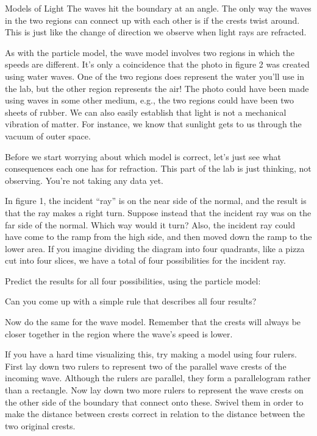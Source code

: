 \begin{lab}{Models of Light}
The waves hit the boundary at an angle. The only way the waves in the two regions can connect up with each
other is if the crests twist around. This is just like the change of direction we observe when light rays are refracted.

As with the particle model, the wave model involves two regions in which the speeds are different.
It's only a coincidence that the photo in figure 2 was created using water waves. One of the two regions does
represent the water you'll use in the lab, but the other region represents the air! The photo could have been
made using waves in some other medium, e.g., the two regions could have been two sheets of rubber. We can also
easily establish that light is not a mechanical vibration of matter. For instance, we know that sunlight gets
to us through the vacuum of outer space. 

\pagebreak[4]

Before we start worrying about which model is correct, let's just see what consequences each one has for
refraction. This part of the lab is just thinking, not observing. You're not taking any data yet.

In figure 1, the incident ``ray'' is on the near side of the normal, and the result is that
the ray makes a right turn. Suppose instead that the incident ray was on the far side of the normal. Which way
would it turn? Also, the incident ray could have come to the ramp from
the high side, and then moved down the ramp to the lower area. If you imagine dividing the diagram into four
quadrants, like a pizza cut into four slices, we have a total of four possibilities for the incident ray.


Predict the results for all four possibilities, using the particle model:


Can you come up with a simple rule that describes all four results?

Now do the same for the wave model. Remember that the crests will always be closer together in the region where the
wave's speed is lower.

If you have a hard time visualizing this, try making a model using four rulers. First lay down two
rulers to represent two of the parallel wave crests of the incoming wave. Although the rulers are
parallel, they form a parallelogram rather than a rectangle.
 Now lay down two more rulers to represent the wave crests on the
other side of the boundary that connect onto these. Swivel them in order to make the distance between
crests correct in relation to the distance between the two original crests.


\end{lab}
